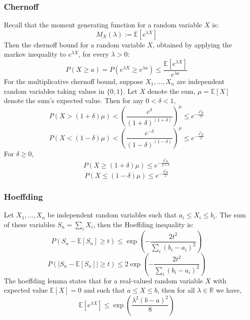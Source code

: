 \documentclass[twoside,twocolumn]{article}
\begin{document}
\subsubsection{Chernoff}
Recall that the moment generating function for a random variable $X$ is:
\begin{equation}
  M_X(\lambda) := \mathbb{E}[e^{\lambda X}]
\end{equation}
Then the chernoff bound for a random variable $X$, obtained by applying the
markov inequality to $e^{\lambda X}$, for every $\lambda > 0$:
\begin{equation}
  P(X \geq a) = P(e^{\lambda X} \geq e^{\lambda a}) \leq \frac{\mathbb{E}[e^{\lambda X}]}{e^{\lambda a}}
\end{equation}
For the multiplicative chernoff bound, suppose $X_1, \hdots, X_n$ are independent
random variables taking values in $\{0, 1\}$. Let $X$ denote the sum, $\mu=\mathbb{E}[X]$
denote the sum's expected value. Then for any $0 < \delta < 1$,
\begin{equation}
  P(X > (1+\delta) \mu ) < \left( \frac{e^{\delta}}{(1+\delta)^{(1+\delta)}} \right)^{\mu} \leq e^{-\frac{\delta^2 \mu}{3}}
\end{equation}
\begin{equation}
  P(X < (1-\delta) \mu ) < \left( \frac{e^{-\delta}}{(1-\delta)^{(1-\delta)}} \right)^{\mu} \leq e^{-\frac{\delta^2 \mu}{2}}
\end{equation}
For $\delta \geq 0$,
\begin{equation}
  P(X \geq (1+\delta) \mu ) \leq e^{-\frac{\delta^2 \mu}{2+\delta}}
\end{equation}
\begin{equation}
  P(X \leq (1-\delta) \mu ) \leq e^{-\frac{\delta^2 \mu}{2}}
\end{equation}
\subsubsection{Hoeffding}
Let $X_1, \hdots, X_n$ be independent random variables such that $a_i \leq X_i \leq b_i$.
The sum of these variables $S_n = \sum_i X_i$, then the Hoeffding
inequality is:
\begin{equation}
  P\left(S_n - \mathbb{E}\left[S_n\right] \geq t \right) \leq \exp\left(-\frac{2t^2}{\sum_i(b_i-a_i)^2}\right)
\end{equation}
\begin{equation}
  P\left(\left|S_n - \mathbb{E}\left[S_n\right]\right| \geq t \right) \leq 2\exp\left(-\frac{2t^2}{\sum_i(b_i-a_i)^2}\right)
\end{equation}
The hoeffding lemma states that for a real-valued random variable $X$ with expected
value $\mathbb{E}[X] = 0$ and such that $a \leq X \leq b$, then for all
$\lambda \in \mathbb{R}$ we have,
\begin{equation}
  \mathbb{E}[e^{\lambda X}] \leq \exp\left(\frac{\lambda^2(b-a)^2}{8}\right)
\end{equation}
\end{document}
